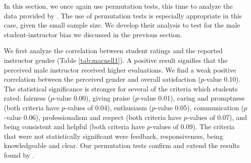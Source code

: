 \documentclass[12pt]{article}
\begin{document}
In this section, we once again use permutation tests, this time to analyze the data provided by \citet{MacNell2014}. The use of permutation tests is especially appropriate in this case, given the small sample size. We develop their analysis to test for the male student-instructor bias we discussed in the previous section. 

We first analyze the correlation between student ratings and the reported instructor gender (Table \ref{tab:macnell1}). A positive result signifies that the perceived male instructor received higher evaluations. We find a weak positive correlation between the perceived gender and overall satisfaction ($p$-value 0.10). The statistical significance is stronger for several of the criteria which students rated: fairness ($p$-value 0.00), giving praise ($p$-value 0.01), caring and promptness (both criteria have $p$-values of 0.04), enthusiasm ($p$-value 0.05), communication ($p$-value 0.06), professionalism and respect (both criteria have $p$-values of 0.07), and being consistent and helpful (both criteria have $p$-values of 0.09). The criteria that were not statistically significant were feedback, responsiveness, being knowledgeable and clear. Our permutation tests confirm and extend the results found by \citet{MacNell2014}.
\end{document}
